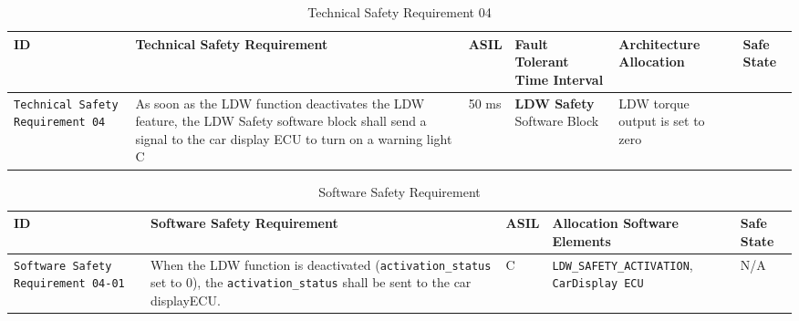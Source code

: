 \begin{table}[!htpb]
\caption{Technical Safety Requirement 04}
\begin{center}
\scriptsize
\renewcommand{\arraystretch}{1.4}
\begin{tabular}{ L{1.8cm}|L{5.2cm}|L{0.7cm}|L{1.3cm}|L{1.8cm}|L{2.0cm}  }
\hline
{}
ID &
Technical Safety Requirement  &
ASIL &
Fault Tolerant Time Interval  &  
Architecture Allocation  &  
Safe State \\\hline
\textcolor{harmonia-blue}{\texttt{Technical Safety Requirement 04}}  &
As soon as the LDW function deactivates the LDW feature, the LDW Safety
software block shall send a signal to the car display ECU to turn on a
warning light
C &
50 ms  &
\textbf{LDW Safety} Software Block  &
LDW torque output is set to zero
\\\hline
\end{tabular}
\end{center}
\label{tab:tr04}
\end{table}


\begin{table}[!htpb]
\caption{Software Safety Requirement}
\begin{center}
\scriptsize
\renewcommand{\arraystretch}{1.4}
\hspace*{-2.0cm}
\begin{tabular}{ L{1.7cm}|L{5.2cm}|L{0.5cm}|L{5.2cm}|L{3.0cm}  }
\hline
{}
ID &
Software Safety Requirement  &
ASIL &
Allocation Software Elements  &  
Safe State \\\hline
\textcolor{harmonia-blue}{\texttt{Software Safety Requirement 04-01}}  &
When the LDW function is deactivated 
(\texttt{activation\_status} set to 0), the
\texttt{activation\_status} shall be sent to the car displayECU.
&
C &
\texttt{LDW\_SAFETY\_ACTIVATION}, \texttt{CarDisplay ECU}  &
N/A
\\\hline
\end{tabular}
\end{center}
\label{tab:sr04}
\end{table}





